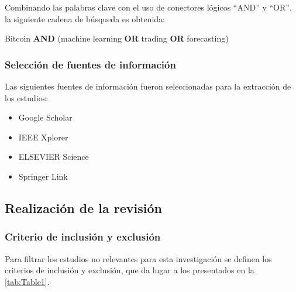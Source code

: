 Combinando las palabras clave con el uso de conectores lógicos “AND” y “OR”, la siguiente cadena de búsqueda es obtenida:\\

\centerline{Bitcoin \textbf{AND} (machine learning \textbf{OR} trading \textbf{OR} forecasting)}

\subsubsection{Selección de fuentes de información}
Las siguientes fuentes de información fueron seleccionadas para la extracción de los estudios:
\begin{itemize}
	\item Google Scholar
	\item IEEE Xplorer
	\item ELSEVIER Science
	\item Springer Link
\end{itemize}

\subsection{Realización de la revisión}
\subsubsection{Criterio de inclusión y exclusión}
Para filtrar los estudios no relevantes para esta investigación se definen los criterios de inclusión y exclusión, que da lugar a los presentados en la \cref{tab:Table1}.

